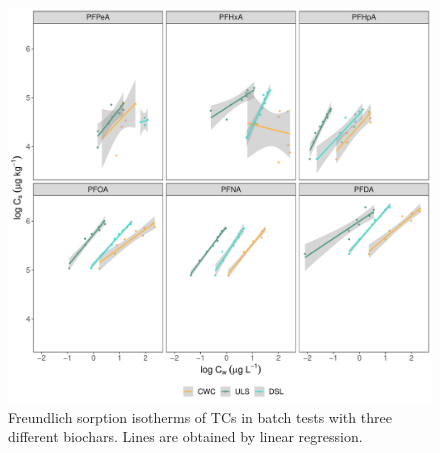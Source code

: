 \begin{figure}[tb]
    \centering
    \includegraphics[width=\textwidth]{R/figs/Sorption_isotherms_single_BC.pdf}
    \caption{Freundlich sorption isotherms of TCs in batch tests with three different biochars. Lines are obtained by linear regression.}
    \label{fig:sorption_isotherms}
\end{figure}

